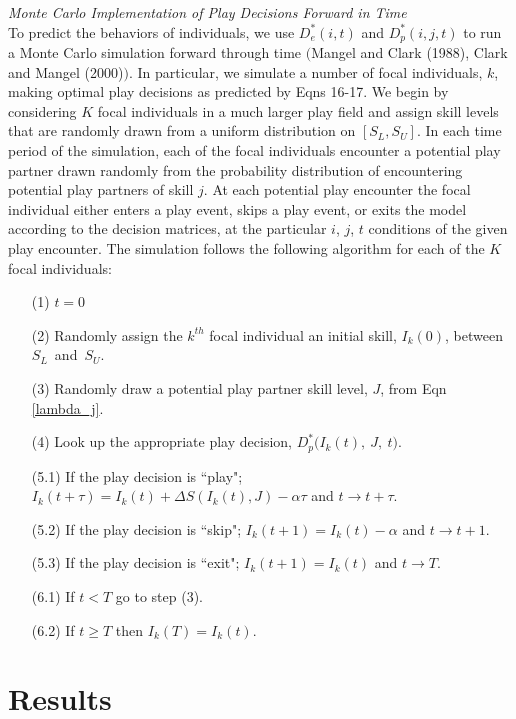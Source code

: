\documentclass[12pt, letterpaper, fleqn]{article}
\begin{document}
	\noindent \textit{Monte Carlo Implementation of Play Decisions Forward in Time} \\
	To predict the behaviors of individuals, we use $D_e^*(i,t)$ and  $D_p^*(i,j,t)$ to run a Monte Carlo simulation forward through time $\big($Mangel and Clark (1988), Clark and Mangel (2000)$\big)$. 
	In particular, we simulate a {\color{red}number of focal individuals, $k$,} making optimal play decisions as predicted by Eqns 16-17. 
	We begin by considering $K$ focal individuals in a much larger play field and assign skill levels that are randomly drawn from a uniform distribution on $[S_L,S_U]$.
	In each time period of the simulation, each of the focal individuals encounter a potential play partner drawn randomly from the probability distribution of encountering potential play partners of skill $j$. %
	At each potential play encounter the focal individual either enters a play event, skips a play event, or exits the model according to the decision matrices, at the particular $i$, $j$, $t$ conditions of the given play encounter.  
	The simulation follows the following algorithm for each of the $K$ focal individuals:
	\begin{itemize}
	\item[(1)] $t=0$
	\item[(2)] Randomly assign the $k^{th}$ focal individual an initial skill, $I_k(0)$, \mbox{between $S_L$ and $S_U$.}   
	\item[(3)] Randomly draw a potential play partner skill level, $J$, from Eqn \ref{lambda_j}.
	\item[(4)] Look up the appropriate play decision, $D_p^*\big(I_k(t),~J,~t\big)$.
	\item[(5.1)] If the play decision is ``play"; $I_k(t+\tau)=I_{k}(t)+\Delta S(I_k(t),J)-\alpha \tau$ and $t \rightarrow t+\tau$. 
	\item[(5.2)] If the play decision is ``skip"; $I_k(t+1)=I_{k}(t)-\alpha$ and $t \rightarrow t+1$.
	\item[(5.3)] If the play decision is ``exit"; $I_k(t+1)=I_{k}(t)$ and $t \rightarrow T$.
	\item[(6.1)] If $t < T$ go to step (3). 
	\item[(6.2)] If $t \ge T$ then $I_k(T)=I_k(t)$.   
	\end{itemize}
	
%
%
\section*{Results}
%
%
\end{document}
